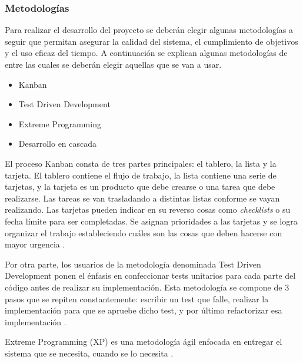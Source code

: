 \documentclass{article}
\begin{document}
\subsubsection{Metodologías}
Para realizar el desarrollo del proyecto se deberán elegir algunas metodologías a seguir que permitan asegurar la calidad del sistema, el cumplimiento de objetivos y el uso eficaz del tiempo. A continuación se explican algunas metodologías de entre las cuales se deberán elegir aquellas que se van a usar.
\begin{itemize}
    \item Kanban
    \item Test Driven Development
    \item Extreme Programming
    \item Desarrollo en cascada
\end{itemize}
El proceso Kanban consta de tres partes principales: el tablero, la lista y la tarjeta. El tablero contiene el flujo de trabajo, la lista contiene una serie de tarjetas, y la tarjeta es un producto que debe crearse o una tarea que debe realizarse. Las tareas se van trasladando a distintas listas conforme se vayan realizando. Las tarjetas pueden indicar en su reverso cosas como \textit{checklists} o su fecha límite para ser completadas. Se asignan prioridades a las tarjetas y se logra organizar el trabajo estableciendo cuáles son las cosas que deben hacerse con mayor urgencia \parencite{completeGuideAgile}.

Por otra parte, los usuarios de la metodología denominada Test Driven Development ponen el énfasis en confeccionar tests unitarios para cada parte del código antes de realizar su implementación. Esta metodología se compone de 3 pasos que se repiten constantemente: escribir un test que falle, realizar la implementación para que se apruebe dicho test, y por último refactorizar esa implementación \parencite[pp. 19-20]{testingJavascript}.

Extreme Programming (XP) es una metodología ágil enfocada en entregar el sistema que se necesita, cuando se lo necesita \parencite{xp}.
\end{document}

